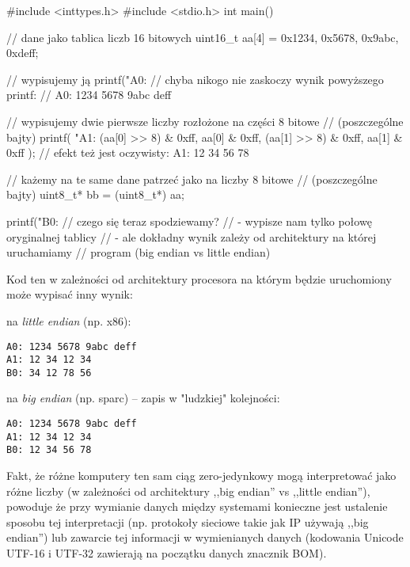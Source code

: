 \begin{CodeFrame*}[c]{}
#include <inttypes.h>
#include <stdio.h>
int main() {
    // dane jako tablica liczb 16 bitowych
    uint16_t aa[4] = {0x1234, 0x5678, 0x9abc, 0xdeff};
    
    // wypisujemy ją
    printf("A0: %
    // chyba nikogo nie zaskoczy wynik powyższego printf:
    //   A0: 1234 5678 9abc deff
    
    // wypisujemy dwie pierwsze liczby rozłożone na części 8 bitowe
    // (poszczególne bajty)
    printf(
        "A1: %
        (aa[0] >> 8) & 0xff, aa[0] & 0xff,
        (aa[1] >> 8) & 0xff, aa[1] & 0xff
    );
    // efekt też jest oczywisty:  A1: 12 34 56 78
    
    // każemy na te same dane patrzeć jako na liczby 8 bitowe
    // (poszczególne bajty)
    uint8_t* bb = (uint8_t*) aa;
    
    printf("B0: %
    // czego się teraz spodziewamy?
    //  - wypisze nam tylko połowę oryginalnej tablicy
    //  - ale dokładny wynik zależy od architektury na której uruchamiamy
    //    program (big endian vs little endian)
}
\end{CodeFrame*}

Kod ten w zależności od architektury procesora na którym będzie uruchomiony może wypisać inny wynik:

\vspace{3pt}
\begin{minipage}[t]{0.33\textwidth}
na \emph{little endian} (np. x86):
\begin{Verbatim}
A0: 1234 5678 9abc deff
A1: 12 34 12 34
B0: 34 12 78 56
\end{Verbatim}
\end{minipage}
\hfill
\begin{minipage}[t]{0.63\textwidth}
na \emph{big endian} (np. sparc) – zapis w "ludzkiej" kolejności:
\begin{Verbatim}
A0: 1234 5678 9abc deff
A1: 12 34 12 34
B0: 12 34 56 78
\end{Verbatim}
\end{minipage}
\vspace{8pt}

Fakt, że różne komputery ten sam ciąg zero-jedynkowy mogą interpretować jako różne liczby (w zależności od architektury ,,big endian'' vs ,,little endian''), powoduje że przy wymianie danych między systemami konieczne jest ustalenie sposobu tej interpretacji (np. protokoły sieciowe takie jak IP używają ,,big endian'') lub zawarcie tej informacji w wymienianych danych (kodowania Unicode UTF-16 i UTF-32 zawierają na początku danych znacznik BOM).
